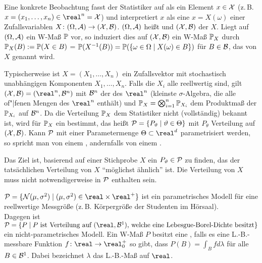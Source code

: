 \begin{Bem}
    Eine konkrete Beobachtung fasst der Statistiker auf als ein Element $x \in \X$
    (z.\,B. $x = (x_1, \dotsc, x_n) \in \real^n = \X$) und interpretiert $x$ als eine
     $x = X(\omega)$ einer Zufallsvariablen
    $X\colon (\Omega, \A) \rightarrow (\X, \B)$.
    $(\Omega, \A)$ heißt  und $(\X, \B)$ 
    der  $X$.
    Liegt auf $(\Omega, \A)$ ein W-Maß $\PP$ vor, so induziert dies auf $(\X, \B)$
    ein W-Maß $\PP_X$ durch $\PP_X(B) := \PP(X \in B)$ =
    $\PP(X^{-1}(B)) = \PP(\{\omega \in \Omega \;|\; X(\omega) \in B\})$ für $B \in \B$,
    das  von $X$ genannt wird.

    Typischerweise ist $X = (X_1, \dotsc, X_n)$ ein Zufallsvektor mit stochastisch unabhängigen
    Komponenten $X_1, \dotsc, X_n$.
    Falls die $X_i$ alle reellwertig sind, gilt $(\X, \B) = (\real^n, \B^n)$ mit
    $\B^n$ der  des $\real^n$
    (kleinste $\sigma$-Algebra, die alle of"|fenen Mengen des $\real^n$ enthält) und
    $\PP_X = \bigotimes_{i=1}^n \PP_{X_i}$ dem Produktmaß der $\PP_{X_i}$ auf $\B^n$.
    Da die Verteilung $\PP_X$ dem Statistiker nicht (vollständig) bekannt ist, wird für $\PP_X$
    ein  bestimmt, das heißt
    $\P = \{P_\theta \;|\; \theta \in \Theta\}$ mit $P_\theta$ Verteilung auf $(\X, \B)$.
    Kann $\P$ mit einer Parametermenge $\Theta \subset \real^d$ parametrisiert werden,
    so spricht man von einem , andernfalls von einem
    .

    Das Ziel ist, basierend auf einer Stichprobe $X$ ein $P_\theta \in \P$ zu finden,
    das der tatsächlichen Verteilung von $X$ "`möglichst ähnlich"' ist.
    Die Verteilung von $X$ muss nicht notwendigerweise in $\P$ enthalten sein.
\end{Bem}

\begin{Bsp}
    $\P = \{\N(\mu, \sigma^2) \;|\; (\mu, \sigma^2) \in \real \times \real^+\}$
    ist ein parametrisches Modell für eine reellwertige Messgröße
    (z.\,B. Körpergröße der Studenten im Hörsaal).\\
    Dagegen ist $\P = \{P \;|\; P \text{ ist Verteilung auf } (\real, \B^1)\text{, welche
    eine Lebesgue-Borel-Dichte besitzt}\}$ ein nicht-parametrisches Modell.
    Ein W-Maß $P$ besitzt eine , falls es eine L.-B.-messbare Funktion
    $f\colon \real \rightarrow \real_0^+$ so gibt, dass $P(B) = \int_B f d\lambda$ für alle
    $B \in \B^1$.
    Dabei bezeichnet $\lambda$ das L.-B.-Maß auf $\real$.
\end{Bsp}

